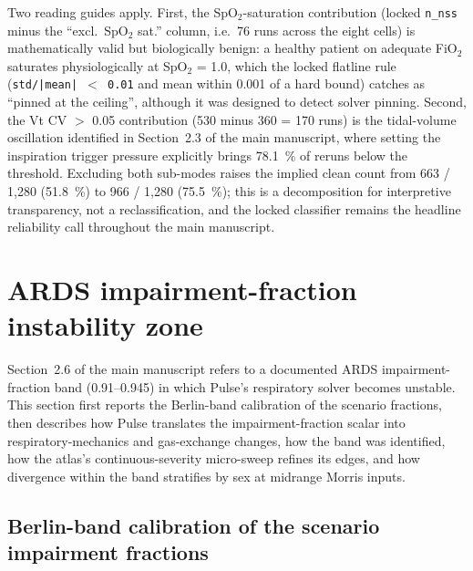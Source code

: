 \documentclass[pdflatex,sn-nature]{sn-jnl}%
\newcommand{\mainref}[2]{#2}
\begin{document}
Two reading guides apply. First, the SpO$_2$-saturation contribution (locked \texttt{n\_nss} minus the ``excl.\ SpO$_2$ sat.'' column, i.e.\ 76 runs across the eight cells) is mathematically valid but biologically benign: a healthy patient on adequate FiO$_2$ saturates physiologically at SpO$_2$ = 1.0, which the locked flatline rule (\texttt{std/|mean| $<$ 0.01} and mean within 0.001 of a hard bound) catches as ``pinned at the ceiling'', although it was designed to detect solver pinning. Second, the Vt CV $>$ 0.05 contribution (530 minus 360 = 170 runs) is the tidal-volume oscillation identified in Section~\mainref{sec:results-vcac}{2.3} of the main manuscript, where setting the inspiration trigger pressure explicitly brings 78.1~\% of reruns below the threshold. Excluding both sub-modes raises the implied clean count from 663 / 1{,}280 (51.8~\%) to 966 / 1{,}280 (75.5~\%); this is a decomposition for interpretive transparency, not a reclassification, and the locked classifier remains the headline reliability call throughout the main manuscript.


\section{ARDS impairment-fraction instability zone}\label{sec:s5}

Section~\mainref{sec:results-secondary}{2.6} of the main manuscript refers to a documented ARDS impairment-fraction band (0.91--0.945) in which Pulse's respiratory solver becomes unstable. This section first reports the Berlin-band calibration of the scenario fractions, then describes how Pulse translates the impairment-fraction scalar into respiratory-mechanics and gas-exchange changes, how the band was identified, how the atlas's continuous-severity micro-sweep refines its edges, and how divergence within the band stratifies by sex at midrange Morris inputs.

\subsection{Berlin-band calibration of the scenario impairment fractions}\label{sec:s5-berlin}
\end{document}
